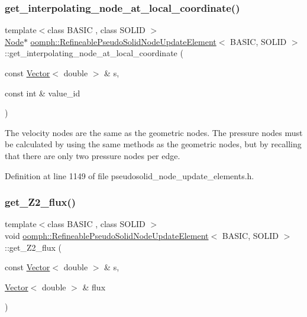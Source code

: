 \subsubsection{\texorpdfstring{get\+\_\+interpolating\+\_\+node\+\_\+at\+\_\+local\+\_\+coordinate()}{get\_interpolating\_node\_at\_local\_coordinate()}}
{\footnotesize\ttfamily template$<$class B\+A\+S\+IC , class S\+O\+L\+ID $>$ \\
\hyperlink{classoomph_1_1Node}{Node}$\ast$ \hyperlink{classoomph_1_1RefineablePseudoSolidNodeUpdateElement}{oomph\+::\+Refineable\+Pseudo\+Solid\+Node\+Update\+Element}$<$ B\+A\+S\+IC, S\+O\+L\+ID $>$\+::get\+\_\+interpolating\+\_\+node\+\_\+at\+\_\+local\+\_\+coordinate (\begin{DoxyParamCaption}\item[{const \hyperlink{classoomph_1_1Vector}{Vector}$<$ double $>$ \&}]{s,  }\item[{const int \&}]{value\+\_\+id }\end{DoxyParamCaption})\hspace{0.3cm}{\ttfamily [inline]}}



The velocity nodes are the same as the geometric nodes. The pressure nodes must be calculated by using the same methods as the geometric nodes, but by recalling that there are only two pressure nodes per edge. 



Definition at line 1149 of file pseudosolid\+\_\+node\+\_\+update\+\_\+elements.\+h.

\mbox{\label{classoomph_1_1RefineablePseudoSolidNodeUpdateElement_acbe1e5ee654278e79ccc9bfa25ab7891}} 
\subsubsection{\texorpdfstring{get\+\_\+\+Z2\+\_\+flux()}{get\_Z2\_flux()}}
{\footnotesize\ttfamily template$<$class B\+A\+S\+IC , class S\+O\+L\+ID $>$ \\
void \hyperlink{classoomph_1_1RefineablePseudoSolidNodeUpdateElement}{oomph\+::\+Refineable\+Pseudo\+Solid\+Node\+Update\+Element}$<$ B\+A\+S\+IC, S\+O\+L\+ID $>$\+::get\+\_\+\+Z2\+\_\+flux (\begin{DoxyParamCaption}\item[{const \hyperlink{classoomph_1_1Vector}{Vector}$<$ double $>$ \&}]{s,  }\item[{\hyperlink{classoomph_1_1Vector}{Vector}$<$ double $>$ \&}]{flux }\end{DoxyParamCaption})\hspace{0.3cm}{\ttfamily [inline]}}

